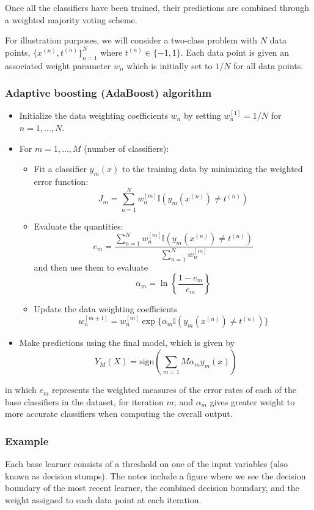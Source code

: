 \documentclass[a4paper,12pt]{article}
\begin{document}
Once all the classifiers have been trained, their predictions are combined through a weighted majority voting scheme. 

For illustration purposes, we will consider a two-class problem with $N$ data points, $\{x^{(n)}, t^{(n)}\}^N_{n=1}$ where $t^{(n)} \in \{-1, 1\}$. Each data point is given an associated weight parameter $w_n$ which is initially set to $1/N$ for all data points. 


\subsubsection{Adaptive boosting (AdaBoost) algorithm}

\begin{itemize}
\item
Initialize the data weighting coefficients $w_n$ by setting $w_n^{[1]} = 1/N$ for $n=1,...,N$. 
\item
For $m=1,...,M$ (number of classifiers): 
\begin{itemize}
\item
Fit a classifier $y_m(x)$ to the training data by minimizing the weighted error function: 
$$J_m = \sum_{n=1}^N w_n^{[m]} \mathbb{I}(y_m(x^{(n)}) \neq t^{(n)})$$
\item
Evaluate the quantities: 
$$e_m = \frac{\sum_{n=1}^N w_n^{[m]} \mathbb{I}(y_m(x^{(n)}) \neq t^{(n)})}{\sum_{n=1}^N w_n^{[m]}}$$
and then use them to evaluate 
$$\alpha_m = \ln \left\{\frac{1 - e_m}{e_m}\right\}$$
\item
Update the data weighting coefficients
$$w_n^{[m+1]} = w_n^{[m]} \exp\{\alpha_m \mathbb{I}(y_m(x^{(n)}) \neq t^{(n)})\}$$
\end{itemize}
\item
Make predictions using the final model, which is given by 
$$Y_M(X) = \text{sign}\left(\sum_{m=1}M \alpha_m y_m(x)\right)$$
\end{itemize}
in which $e_m$ represents the weighted measures of the error rates of each of the base classifiers in the dataset, for iteration $m$; and $\alpha_m$ gives greater weight to more accurate classifiers when computing the overall output. 

\subsubsection{Example}

Each base learner consists of a threshold on one of the input variables (also known as decision stumps). The notes include a figure where we see the decision boundary of the most recent learner, the combined decision boundary, and the weight assigned to each data point at each iteration. 
\end{document}
